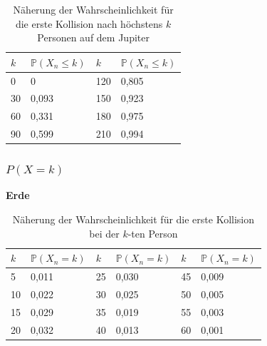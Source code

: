 \documentclass[../main.tex]{subfiles}
\begin{document}
    \begin{table}[h]
        \centering
        \begin{tabular}{|l|l|l|l|}
            \hline
            $k$ & $\mathbb{P}(X_{n} \leq k)$ & $k$ & $\mathbb{P}(X_{n} \leq k)$ \\ \hline
            0   & 0                          & 120 & 0,805                      \\
            30  & 0,093                      & 150 & 0,923                      \\
            60  & 0,331                      & 180 & 0,975                      \\
            90  & 0,599                      & 210 & 0,994                      \\ \hline
        \end{tabular}
        \caption{\label{num.tpj} Näherung der Wahrscheinlichkeit für die erste Kollision nach höchstens $k$ Personen auf dem Jupiter}
    \end{table}

    \subsubsection{$P(X = k)$}

    \textbf{Erde}

    \begin{table}[h]
        \centering
        \begin{tabular}{|l|l|l|l|l|l|}
            \hline
            $k$ & $\mathbb{P}(X_{n} = k)$ & $k$ & $\mathbb{P}(X_{n} = k)$ & $k$ & $\mathbb{P}(X_{n} = k)$ \\ \hline
            5   & 0,011                   & 25  & 0,030                   & 45  & 0,009                   \\
            10  & 0,022                   & 30  & 0,025                   & 50  & 0,005                   \\
            15  & 0,029                   & 35  & 0,019                   & 55  & 0,003                   \\
            20  & 0,032                   & 40  & 0,013                   & 60  & 0,001                   \\ \hline
        \end{tabular}
        \caption{\label{num.tpeqe} Näherung der Wahrscheinlichkeit für die erste Kollision bei der $k$-ten Person}
    \end{table}
\end{document}
